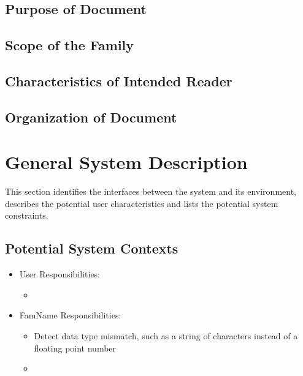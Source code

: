 \documentclass[12pt]{article}
\newcommand{\famname}{FamName} %
\begin{document}

\subsection{Purpose of Document}

\subsection{Scope of the Family}

\subsection{Characteristics of Intended Reader}

\subsection{Organization of Document}

\section{General System Description}

This section identifies the interfaces between the system and its environment, describes the
potential user characteristics and lists the potential system constraints.

\subsection{Potential System Contexts}


\begin{itemize}
	\item User Responsibilities:
	      \begin{itemize}
		      \item
	      \end{itemize}
	\item \famname{} Responsibilities:
	      \begin{itemize}
		      \item Detect data type mismatch, such as a string of characters instead of a floating point number \item
	      \end{itemize}
\end{itemize}
\end{document}
